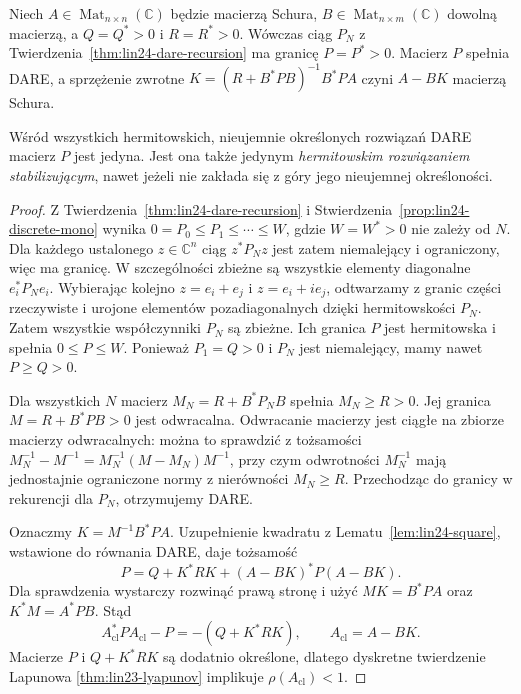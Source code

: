 \begin{twierdzenie}
\label{thm:lin24-dare-existence}
Niech \(A\in\operatorname{Mat}_{n\times n}(\mathbb C)\)
będzie macierzą Schura,
\(B\in\operatorname{Mat}_{n\times m}(\mathbb C)\)
dowolną macierzą,
a \(Q=Q^*>0\) i \(R=R^*>0\).
Wówczas ciąg \(P_N\)
z Twierdzenia~\ref{thm:lin24-dare-recursion}
ma granicę \(P=P^*>0\).
Macierz \(P\) spełnia DARE,
a sprzężenie zwrotne
\(K=(R+B^*PB)^{-1}B^*PA\)
czyni \(A-BK\) macierzą Schura.

Wśród wszystkich
hermitowskich, nieujemnie
określonych rozwiązań DARE
macierz \(P\) jest jedyna.
Jest ona także jedynym
\emph{hermitowskim rozwiązaniem
stabilizującym}, nawet jeżeli
nie zakłada się z góry jego
nieujemnej określoności.
\end{twierdzenie}
\begin{proof}
Z
Twierdzenia~\ref{thm:lin24-dare-recursion}
i Stwierdzenia~\ref{prop:lin24-discrete-mono}
wynika
\(0=P_0\le P_1\le\cdots\le W\),
gdzie \(W=W^*>0\)
nie zależy od \(N\).
Dla każdego ustalonego
\(z\in\mathbb C^n\)
ciąg \(z^*P_Nz\) jest zatem
niemalejący i ograniczony,
więc ma granicę.
W szczególności zbieżne są
wszystkie elementy diagonalne
\(e_i^*P_Ne_i\).
Wybierając kolejno
\(z=e_i+e_j\) i
\(z=e_i+ie_j\),
odtwarzamy z granic
części rzeczywiste i urojone
elementów pozadiagonalnych
dzięki hermitowskości \(P_N\).
Zatem wszystkie współczynniki
\(P_N\) są zbieżne.
Ich granica \(P\)
jest hermitowska i spełnia
\(0\le P\le W\).
Ponieważ \(P_1=Q>0\)
i \(P_N\) jest niemalejący,
mamy nawet \(P\ge Q>0\).

Dla wszystkich \(N\)
macierz \(M_N=R+B^*P_NB\)
spełnia \(M_N\ge R>0\).
Jej granica
\(M=R+B^*PB>0\)
jest odwracalna.
Odwracanie macierzy
jest ciągłe na zbiorze
macierzy odwracalnych:
można to sprawdzić
z tożsamości
\(M_N^{-1}-M^{-1}
 =M_N^{-1}(M-M_N)M^{-1}\),
przy czym odwrotności \(M_N^{-1}\)
mają jednostajnie ograniczone
normy z nierówności \(M_N\ge R\).
Przechodząc do granicy
w rekurencji dla \(P_N\),
otrzymujemy DARE.

Oznaczmy
\(K=M^{-1}B^*PA\).
Uzupełnienie kwadratu
z Lematu~\ref{lem:lin24-square},
wstawione do równania DARE,
daje tożsamość
\[
 P=Q+K^*RK+(A-BK)^*P(A-BK).
\]
Dla sprawdzenia wystarczy
rozwinąć prawą stronę
i użyć \(MK=B^*PA\)
oraz \(K^*M=A^*PB\).
Stąd
\[
 A_{\mathrm{cl}}^*PA_{\mathrm{cl}}-P
 =-(Q+K^*RK),
 \qquad A_{\mathrm{cl}}=A-BK.
\]
Macierze \(P\) i
\(Q+K^*RK\) są dodatnio
określone, dlatego
dyskretne twierdzenie Lapunowa
\ref{thm:lin23-lyapunov}
implikuje \(\rho(A_{\mathrm{cl}})<1\).


\end{proof}
